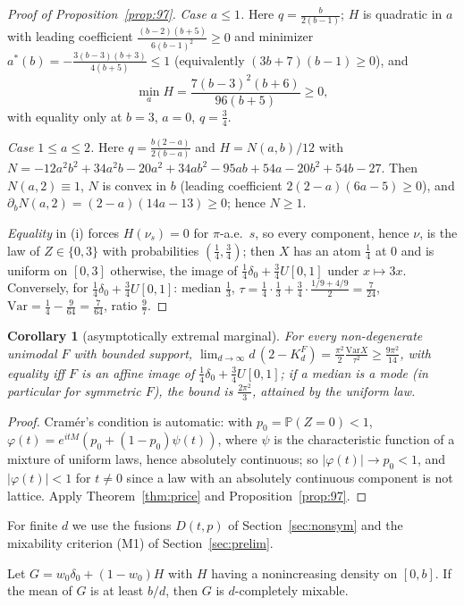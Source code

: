 \documentclass[11pt]{amsart}
\newtheorem{corollary}[theorem]{Corollary}\newtheorem{conjecture}[theorem]{Conjecture}
\theoremstyle{definition}\newtheorem{definition}[theorem]{Definition}\theoremstyle{remark}\newtheorem{remark}[theorem]{Remark}
\begin{document}
\begin{proof}[Proof of Proposition~\ref{prop:97}]
\emph{Case $a\le1$.} Here $q=\frac b{2(b-1)}$; $H$ is quadratic in $a$ with leading coefficient $\frac{(b-2)(b+5)}{6(b-1)^2}\ge0$ and minimizer $a^*(b)=-\frac{3(b-3)(b+3)}{4(b+5)}\le1$
(equivalently $(3b+7)(b-1)\ge0$), and
\[\min_aH=\frac{7(b-3)^2(b+6)}{96(b+5)}\ge0,\]
with equality only at $b=3$, $a=0$, $q=\frac34$.

\emph{Case $1\le a\le2$.} Here $q=\frac{b(2-a)}{2(b-a)}$ and $H=N(a,b)/12$ with $N=-12a^2b^2+34a^2b-20a^2+34ab^2-95ab+54a-20b^2+54b-27$. Then $N(a,2)\equiv1$, $N$ is convex
in $b$ (leading coefficient $2(2-a)(6a-5)\ge0$), and $\partial_bN(a,2)=(2-a)(14a-13)\ge0$; hence $N\ge1$.

\emph{Equality} in (i) forces $H(\nu_s)=0$ for $\pi$-a.e.\ $s$, so every component, hence $\nu$, is the law of $Z\in\{0,3\}$ with probabilities $(\frac14,\frac34)$;
then $X$ has an atom $\frac14$ at $0$ and is uniform on $[0,3]$ otherwise, the image of $\frac14\delta_0+\frac34U[0,1]$ under $x\mapsto3x$. Conversely, for
$\frac14\delta_0+\frac34U[0,1]$: median $\frac13$, $\tau=\frac14\cdot\frac13+\frac34\cdot\frac{1/9+4/9}2=\frac7{24}$, $\mathrm{Var}=\frac14-\frac9{64}=\frac7{64}$, ratio $\frac97$.\end{proof}
\begin{corollary}[asymptotically extremal marginal]\label{cor:asym-ext}
For every non-degenerate unimodal $F$ with bounded support, $\lim_{d\to\infty}d\,(2-K_d^F)=\frac{\pi^2}2\frac{\mathrm{Var}X}{\tau^2}\ge\frac{9\pi^2}{14}$, with equality iff $F$ is an
affine image of $\frac14\delta_0+\frac34U[0,1]$; if a median is a mode (in particular for symmetric $F$), the bound is $\frac{2\pi^2}3$, attained by the uniform law.
\end{corollary}
\begin{proof}Cram\'er's condition is automatic: with $p_0=\mathbb P(Z=0)<1$, $\varphi(t)=e^{itM}(p_0+(1-p_0)\psi(t))$, where $\psi$ is the characteristic function of a mixture
of uniform laws, hence absolutely continuous; so $|\varphi(t)|\to p_0<1$, and $|\varphi(t)|<1$ for $t\ne0$ since a law with an absolutely continuous component is not
lattice. Apply Theorem~\ref{thm:price} and Proposition~\ref{prop:97}.\end{proof}
\noindent For finite $d$ we use the fusions $D(t,p)$ of Section~\ref{sec:nonsym} and the mixability criterion (M1) of Section~\ref{sec:prelim}.
\begin{lemma}\label{lem:atom}
Let $G=w_0\delta_0+(1-w_0)H$ with $H$ having a nonincreasing density on $[0,b]$. If the mean of $G$ is at least $b/d$, then $G$ is $d$-completely mixable.
\end{lemma}
\end{document}
